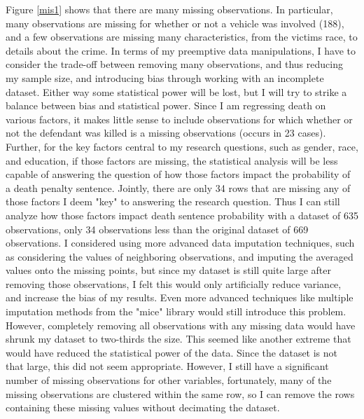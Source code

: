 \documentclass{article}
\begin{document}
Figure \ref{mis1} shows that there are many missing observations. In particular, many observations are missing for whether or not a vehicle was involved (188), and a few observations are missing many characteristics, from the victims race, to details about the crime. In terms of my preemptive data manipulations, I have to consider the trade-off between removing many observations, and thus reducing my sample size, and introducing bias through working with an incomplete dataset. Either way some statistical power will be lost, but I will try to strike a balance between bias and statistical power. Since I am regressing death on various factors, it makes little sense to include observations for which whether or not the defendant was killed is a missing observations (occurs in 23 cases). Further, for the key factors central to my research questions, such as gender, race, and education, if those factors are missing, the statistical analysis will be less capable of answering the question of how those factors impact the probability of a death penalty sentence. Jointly, there are only 34 rows that are missing any of those factors I deem "key" to answering the research question. Thus I can still analyze how those factors impact death sentence probability with a dataset of 635 observations, only 34 observations less than the original dataset of 669 observations. I considered using more advanced data imputation techniques, such as considering the values of neighboring observations, and imputing the averaged values onto the missing points, but since my dataset is still quite large after removing those observations, I felt this would only artificially reduce variance, and increase the bias of my results. Even more advanced techniques like multiple imputation methods from the "mice" library would still introduce this problem. However, completely removing all observations with any missing data would have shrunk my dataset to two-thirds the size. This seemed like another extreme that would have reduced the statistical power of the data. Since the dataset is not that large, this did not seem appropriate. However, I still have a significant number of missing observations for other variables, fortunately, many of the missing observations are clustered within the same row, so I can remove the rows containing these missing values without decimating the dataset.
\end{document}
